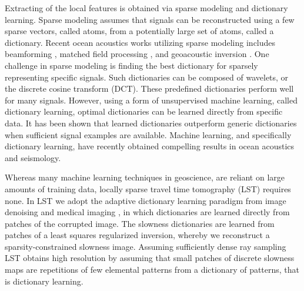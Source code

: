 Extracting of the local features is obtained via sparse modeling and dictionary learning.
Sparse modeling assumes that signals can be reconstructed using a few sparse vectors, called atoms, from a potentially large set of atoms, called a dictionary. Recent ocean acoustics works utilizing sparse modeling includes beamforming \cite{Xenaki2014}, matched field processing \cite{Gemba2017}, and geoacoustic inversion \cite{gerstoft2018}. One challenge in sparse modeling is finding the best dictionary for sparsely representing specific signals. Such dictionaries can be composed of wavelets, or the discrete cosine transform (DCT). These predefined dictionaries perform well for many signals. However, using a form of unsupervised machine learning, called dictionary learning, optimal dictionaries can be learned directly from specific data\cite{mallat1999}. It has been shown that learned dictionaries outperform generic dictionaries when sufficient signal examples are available. Machine learning, and specifically dictionary learning, have recently obtained compelling results in ocean acoustics \cite{Bianco2017} and seismology\cite{kong2018}. 


Whereas many machine learning techniques in geoscience\cite{kong2018}, are reliant on large amounts of training data, locally sparse travel time tomography (LST)\cite{bianco2018} requires none. In LST we adopt the adaptive dictionary learning paradigm from image denoising \cite{elad2010} and medical imaging \cite{ravishankar2011}, in which dictionaries are learned directly from patches of the corrupted image. The slowness dictionaries are learned from patches of a least squares regularized inversion, whereby we reconstruct a sparsity-constrained slowness image. Assuming sufficiently dense ray sampling 
LST \cite{bianco2018} obtains high resolution by assuming that small patches of discrete slowness maps are repetitions of few elemental patterns from a dictionary of patterns, that is dictionary learning. 

